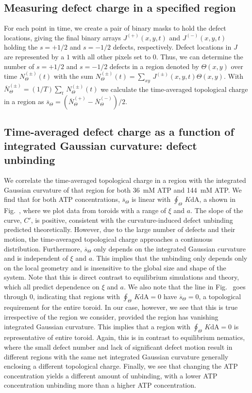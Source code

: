 \subsection{Measuring defect charge in a specified region}
For each point in time, we create a pair of binary masks to hold the defect locations, giving the final binary arrays $J^{(+)}(x,y,t)$ and $J^{(-)}(x,y,t)$ holding the $s = +1/2$ and $s = -1/2$ defects, respectively.
Defect locations in $J$ are represented by a $1$ with all other pixels set to $0$.
Thus, we can determine the number of $s = +1/2$ and $s = -1/2$ defects in a region denoted by $\Theta(x,y)$ over time $N^{(\pm)}_{\Theta}(t)$ with the sum $N^{(\pm)}_{\Theta}(t) = \sum\limits_{xy}\,J^{(\pm)}(x,y,t)\Theta(x,y)$.
With $\overbar{N}^{(\pm)}_{\Theta} = (1/T)\sum\limits_t \, N^{(\pm)}_{\Theta}(t)$ we calculate the time-averaged topological charge in a region as $\overbar{s}_{\Theta} = (\overbar{N}^{(+)}_{\Theta} - \overbar{N}^{(-)}_{\Theta})/2$.


\subsection{Time-averaged defect charge as a function of integrated Gaussian curvature: defect unbinding}
We correlate the time-averaged topological charge in a region with the integrated Gaussian curvature of that region for both 36~mM ATP and 144~mM ATP.
We find that for both ATP concentrations, $\overbar{s}_{\Theta}$ is linear with $\oint_{\Theta}\,K\textrm{dA}$, a shown in Fig.~, where we plot data from toroids with a range of $\xi$ and $a$.
The slope of the curve, $C'$, is positive, consistent with the curvature-induced defect unbinding predicted theoretically.
However, due to the large number of defects and their motion, the time-averaged topological charge approaches a continuous distribution.
Furthermore, $\overbar{s}_{\Theta}$ only depends on the integrated Gaussian curvature and is independent of $\xi$ and $a$.
This implies that the unbinding only depends only on the local geometry and is insensitive to the  global size and shape of the system.
Note that this is direct contrast to equilibrium simulations and theory, which all predict dependence on $\xi$ and $a$.
We also note that the line in Fig.~ goes through 0, indicating that regions with $\oint_{\Theta}\,K\textrm{dA} = 0$ have $\overbar{s}_{\Theta} = 0$, a topological requirement for the entire toroid.
In our case, however, we see that this is true irrespective of the region we consider, provided the region has vanishing integrated Gaussian curvature.
This implies that a region with $\oint_{\Theta}\,K\textrm{dA} = 0$ is representative of entire toroid.
Again, this is in contrast to equilibrium nematics, where the small defect number and lack of significant defect motion result in different regions with the same net integrated Gaussian curvature generally enclosing a different topological charge.
Finally, we see that changing the ATP concentration yields a different amount of unbinding, with a lower ATP concentration unbinding more than a higher ATP concentration. \\

